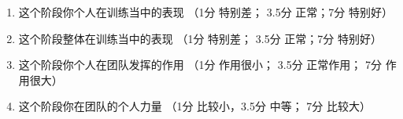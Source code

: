 \begin{CJK}{UTF8}{gbsn}
\begin{enumerate}
\item 这个阶段你个人在训练当中的表现 （1分 特别差； 3.5分 正常；7分 特别好）
\item 这个阶段整体在训练当中的表现 （1分 特别差； 3.5分 正常；7分 特别好）
\item 这个阶段你个人在团队发挥的作用 （1分 作用很小； 3.5分 正常作用； 7分 作用很大）
\item 这个阶段你在团队的个人力量 （1分 比较小，3.5分 中等； 7分 比较大）
\end{enumerate}



























































































\end{CJK}

